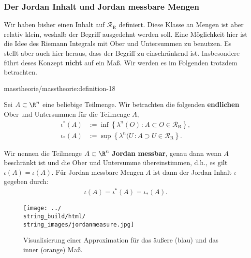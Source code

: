 \documentclass[letterpaper,10pt,english]{jupyterBook}
\begin{document}
\subsubsection{Der Jordan Inhalt und Jordan messbare Mengen}
\label{\detokenize{masstheorie/masstheorie:der-jordan-inhalt-und-jordan-messbare-mengen}}
\par
Wir haben bisher einen Inhalt auf \(\mathcal{R}_{\text{R}}\) definiert. Diese Klasse an Mengen ist aber relativ klein, weshalb der Begriff ausgedehnt werden soll. Eine Möglichkeit hier ist die Idee des Riemann Integrals mit Ober  und Untersummen zu benutzen. Es stellt aber auch hier heraus, dass der Begriff zu einschränkend ist. Insbesondere führt deses Konzept \textbf{nicht} auf ein Maß. Wir werden es im Folgenden trotzdem betrachten.
\begin{definition}{}{masstheorie/masstheorie:definition-18}



\par
Sei \(A \subset \R^n\) eine beliebige Teilmenge.
Wir betrachten die folgenden \textbf{endlichen} Ober  und Untersummen für die Teilmenge \(A\),
\begin{align*}
\iota^\ast(A) &:= \inf \left\{ \lambda^n(O) \, : A \subset O \in\mathcal{R}_{\text{R}}\right\},\\
\iota_\ast(A) &:= \sup \left\{ \lambda^n(U \, : A \supset U\in\mathcal{R}_{\text{R}} \right\}.
\end{align*}
\par
Wir nennen die Teilmenge \(A \subset \R^n\) \textbf{Jordan messbar}, genau dann wenn \(A\) beschränkt ist und die Ober  und Untersumme übereinstimmen, d.h., es gilt \(\iota(A) = \iota(A)\).
Für Jordan messbare Mengen \(A\) ist dann der Jordan Inhalt \(\iota\) gegeben durch:
\begin{align*}
\iota(A) = \iota^\ast(A) = \iota_\ast(A).
\end{align*}\end{definition}

\begin{figure}[htbp]
\centering


\noindent\texttt{[image: ../\\string\_build/html/\\string\_images/jordanmeasure.jpg]}
\caption{Visualisierung einer Approximation für das äußere (blau) und das inner (orange) Maß.}\label{\detokenize{masstheorie/masstheorie:id1}}\end{figure}
\end{document}
